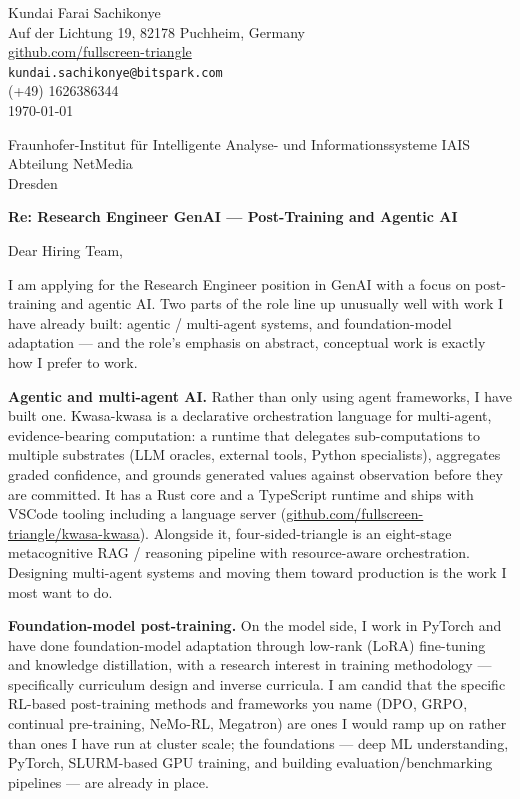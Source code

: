 \documentclass[12pt,a4paper]{article}
\begin{document}
\begin{flushright}
Kundai Farai Sachikonye \\
Auf der Lichtung 19, 82178 Puchheim, Germany \\
\href{https://github.com/fullscreen-triangle}{github.com/fullscreen-triangle} \\
\texttt{kundai.sachikonye@bitspark.com} \\
(+49) 1626386344 \\[6pt]
\today
\end{flushright}

\vspace{1em}

Fraunhofer-Institut für Intelligente Analyse- und Informationssysteme IAIS \\
Abteilung NetMedia \\
Dresden

\vspace{1.5em}

\textbf{Re: Research Engineer GenAI --- Post-Training and Agentic AI}

\vspace{1em}

Dear Hiring Team,

I am applying for the Research Engineer position in GenAI with a focus on
post-training and agentic AI. Two parts of the role line up unusually well with
work I have already built: agentic / multi-agent systems, and foundation-model
adaptation --- and the role's emphasis on abstract, conceptual work is exactly how
I prefer to work.

\textbf{Agentic and multi-agent AI.}
Rather than only using agent frameworks, I have built one. Kwasa-kwasa is a
declarative orchestration language for multi-agent, evidence-bearing computation:
a runtime that delegates sub-computations to multiple substrates (LLM oracles,
external tools, Python specialists), aggregates graded confidence, and grounds
generated values against observation before they are committed. It has a Rust core
and a TypeScript runtime and ships with VSCode tooling including a language server
(\href{https://github.com/fullscreen-triangle/kwasa-kwasa}{github.com/fullscreen-triangle/kwasa-kwasa}).
Alongside it, four-sided-triangle is an eight-stage metacognitive RAG / reasoning
pipeline with resource-aware orchestration. Designing multi-agent systems and
moving them toward production is the work I most want to do.

\textbf{Foundation-model post-training.}
On the model side, I work in PyTorch and have done foundation-model adaptation
through low-rank (LoRA) fine-tuning and knowledge distillation, with a research
interest in training methodology --- specifically curriculum design and inverse
curricula. I am candid that the specific RL-based post-training methods and
frameworks you name (DPO, GRPO, continual pre-training, NeMo-RL, Megatron) are
ones I would ramp up on rather than ones I have run at cluster scale; the
foundations --- deep ML understanding, PyTorch, SLURM-based GPU training, and
building evaluation/benchmarking pipelines --- are already in place.
\end{document}
